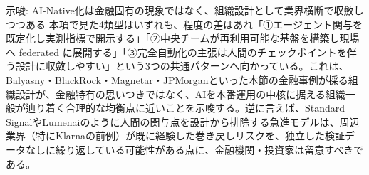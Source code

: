 \begin{insight}{示唆: AI-Native化は金融固有の現象ではなく、組織設計として業界横断で収斂しつつある}
本項で見た4類型はいずれも、程度の差はあれ「①エージェント関与を既定化し実測指標で開示する」「②中央チームが再利用可能な基盤を構築し現場へ federated に展開する」「③完全自動化の主張は人間のチェックポイントを伴う設計に収斂しやすい」という3つの共通パターンへ向かっている。これは、Balyasny・BlackRock・Magnetar・JPMorganといった本節の金融事例が採る組織設計が、金融特有の思いつきではなく、AIを本番運用の中核に据える組織一般が辿り着く合理的な均衡点に近いことを示唆する。逆に言えば、Standard SignalやLumenaiのように人間の関与点を設計から排除する急進モデルは、周辺業界（特にKlarnaの前例）が既に経験した巻き戻しリスクを、独立した検証データなしに繰り返している可能性がある点に、金融機関・投資家は留意すべきである。
\end{insight}
